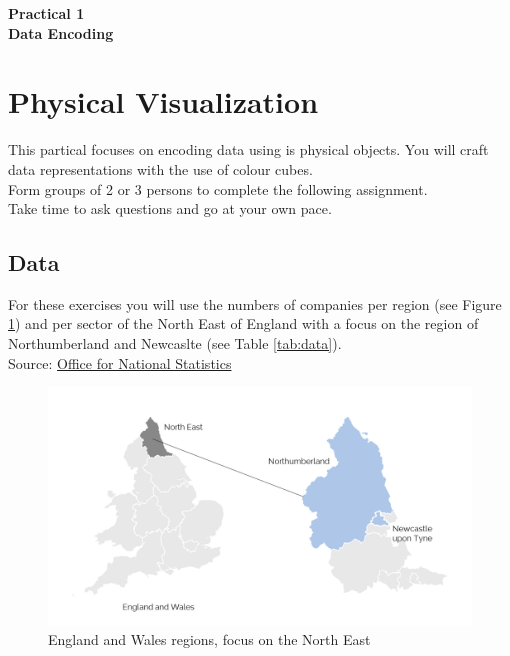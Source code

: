 \documentclass[11pt]{article}
\begin{document}
\pagestyle{fancy}
\renewcommand{\headrulewidth}{0pt}

\begin{center}
\vspace*{1cm}
{\textbf {\Huge Practical 1}}\\
\vspace*{0.5cm}
{\textbf {\huge Data Encoding}}
\vspace*{1cm}
\end{center}

\section{Physical Visualization}

This partical focuses on encoding data using is physical objects. You will craft data representations with the use of colour cubes.\\

Form groups of 2 or 3 persons to complete the following assignment.\\

Take time to ask questions and go at your own pace.

\subsection*{Data}

For these exercises you will use the numbers of companies per region (see Figure \ref{fig:map}) and per sector of the North East of England with a focus on the region of Northumberland and Newcaslte (see Table \ref{tab:data}).\\
Source: \href{https://www.ons.gov.uk/businessindustryandtrade/business/activitysizeandlocation/datasets/ukbusinessactivitysizeandlocation}{Office for National Statistics}\\

\begin{figure}[h!]
    \centering
    \includegraphics[width=.8\columnwidth]{img/NEmap.png}
    \caption{England and Wales regions, focus on the North East}
    \label{fig:map}
\end{figure}
\end{document}
